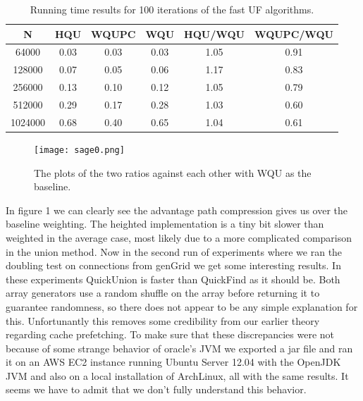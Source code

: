\documentclass{article}
\begin{document}
\begin{table}[H]
	\begin{center}
		\begin{tabular}{c | c c c c c } %
			\toprule
			{\bf N} & {\bf HQU} & {\bf WQUPC } & {\bf  WQU} & {\bf HQU/WQU} & {\bf WQUPC/WQU }  \\ 
			\midrule
			64000 & 0.03 & 0.03 & 0.03 & 1.05 & 0.91 \\
			128000 & 0.07 & 0.05 & 0.06 & 1.17 & 0.83 \\
			256000 & 0.13 & 0.10 & 0.12 & 1.05 & 0.79 \\
			512000 & 0.29 & 0.17 & 0.28 & 1.03 & 0.60 \\
			1024000 & 0.68 & 0.40 & 0.65 & 1.04 & 0.61 \\
			\bottomrule
		\end{tabular}
		\caption{Running time results for 100 iterations of the fast UF algorithms.}
		\label{tab:deami2}
	\end{center}
\end{table}

\begin{figure}[h]
	\begin{center}
		\texttt{[image: sage0.png]} %
		\caption{The plots of the two ratios against each other with WQU as the baseline.}
	\end{center}
\end{figure}

In figure 1 we can clearly see the advantage path compression gives us over the baseline weighting. The heighted implementation is a tiny bit slower than weighted in the average case, most likely due to a more complicated comparison in the union method.
Now in the second run of experiments where we ran the doubling test on connections from genGrid we get some interesting results. In these experiments QuickUnion is faster than QuickFind as it should be. Both array generators use a random shuffle on the array before returning it to guarantee randomness, so there does not appear to be any simple explanation for this. Unfortunantly this removes some credibility from our earlier theory regarding cache prefetching. To make sure that these discrepancies were not because of some strange behavior of oracle's JVM we exported a jar file and ran it on an AWS EC2 instance running Ubuntu Server 12.04 with the OpenJDK JVM and also on a local installation of ArchLinux, all with the same results. It seems we have to admit that we don't fully understand this behavior.
\end{document}
